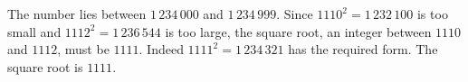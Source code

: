 The number lies between $1\,234\,000$ and $1\,234\,999$. Since $1110^2=1\,232\,100$ is too small and $1112^2=1\,236\,544$ is too large, the square root, an integer between $1110$ and $1112$, must be $1111$. Indeed $1111^2=1\,234\,321$ has the required form. The square root is $\boxed{1111}$.
